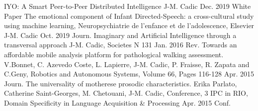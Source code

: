 \begin{cvhonors}
\cvpublication
    {IYO: A Smart Peer-to-Peer Distributed Intelligence}
    {J-M. Cadic}
    {Dec. 2019}
    {White Paper}
\cvpublication
    {The emotional component of Infant Directed-Speech: a cross-cultural study using machine learning, Neuropsychiatrie de l'enfance et de l'adolescence, Elsevier}
    {J-M. Cadic}
    {Oct. 2019}
    {Journ.}
  \cvpublication
    {Imaginary and Artificial Intelligence through a transversal approach}
    {J-M. Cadic, Societes N 131}
    {Jan. 2016}
    {Rev.}
  \cvpublication
    {Towards an affordable mobile analysis platform for pathological walking assessment.}
    {V.Bonnet, C. Azevedo Coste, L. Lapierre, J-M. Cadic, P. Fraisse, R. Zapata and C.Geny, Robotics and Autonomous Systems, Volume 66, Pages 116-128}
    {Apr. 2015}
    {Journ.}
  \cvpublication
    {The universality of motherese prosodic characteristics.}
    {Erika Parlato, Catherine Saint-Georges, M. Chetouani, J-M. Cadic, Conference, 3 IPC in RIO, Domain Specificity in Language Acquisition \& Processing}
    {Apr. 2015}
    {Conf.}
\end{cvhonors}
